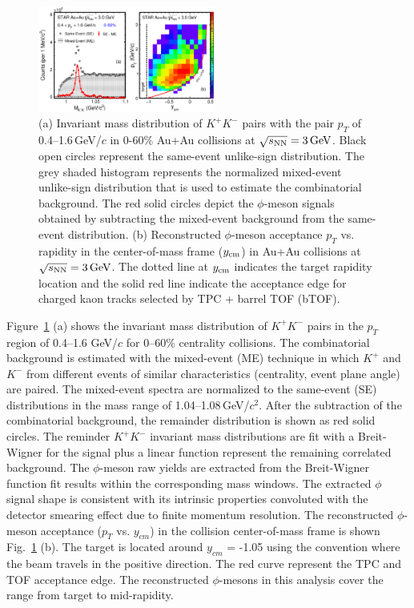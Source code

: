 \documentclass[%
 reprint,	
showpacs,
 amsmath,amssymb,
 aps,
 prc,
]{revtex4-1}
\begin{document}
\begin{figure}
\centering
\hspace*{-4mm}
\includegraphics[width=0.52\textwidth]{fig/fig1_signal.eps}
  \caption{(a) Invariant mass distribution of $K^+K^-$ pairs with the pair $p_T$ of 0.4--1.6\,GeV/$c$ in 0-60\% Au+Au collisions at ${\sqrt{s_{\rm NN}} = \rm{3\,GeV}}$. Black open circles represent the same-event unlike-sign distribution. The grey shaded histogram represents the normalized mixed-event unlike-sign distribution that is used to estimate the combinatorial background. The red solid circles depict the $\phi$-meson signals obtained by subtracting the mixed-event background from the same-event distribution. (b) Reconstructed $\phi$-meson acceptance $p_T$ vs. rapidity in the center-of-mass frame ($y_{\rm cm}$) in Au+Au collisions at ${\sqrt{s_{\rm NN}} = \rm{3\,GeV}}$. The dotted line at $y_{\rm cm}$ indicates the target rapidity location and the solid red line indicate the acceptance edge for charged kaon tracks selected by TPC + barrel TOF (bTOF).}
\label{fig:phiSignal} 
\end{figure}


Figure~\ref{fig:phiSignal} (a) shows the invariant mass distribution of $K^+K^-$ pairs in the $p_{T}$ region of 0.4--1.6 GeV/$c$ for 0--60\% centrality collisions. The combinatorial background is estimated with the mixed-event (ME) technique in which $K^+$ and $K^-$ from different events of similar characteristics (centrality, event plane angle) are paired. The mixed-event spectra are normalized to the same-event (SE) distributions in the mass range of 1.04--1.08\,GeV/$c^2$. After the subtraction of the combinatorial background, the remainder distribution is shown as red solid circles. The reminder $K^+K^-$ invariant mass distributions are fit with a Breit-Wigner for the signal plus a linear function represent the remaining correlated background. The $\phi$-meson raw yields are extracted from the Breit-Wigner function fit results within the corresponding mass windows. The extracted $\phi$ signal shape is consistent with its intrinsic properties convoluted with the detector smearing effect due to finite momentum resolution. The reconstructed $\phi$-meson acceptance ($p_T$ vs. $y_{cm}$) in the collision center-of-mass frame is shown Fig.~\ref{fig:phiSignal} (b). The target is located around $y_{cm}$ = -1.05 using the convention where the beam travels in the positive direction. The red curve represent the TPC and TOF acceptance edge. The reconstructed $\phi$-mesons in this analysis cover the range from target to mid-rapidity.
\end{document}
